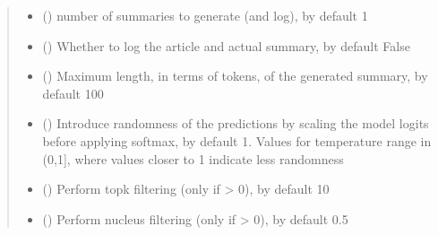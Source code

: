 \documentclass[letterpaper,10pt,english]{sphinxmanual}
\begin{document}
\begin{fulllineitems}
\begin{fulllineitems}
\begin{quote}
\begin{description}
\begin{itemize}
\item {} 
\sphinxAtStartPar
{} (\sphinxstyleliteralemphasis{\sphinxupquote{, }}) \textendash{} number of summaries to generate (and log), by default 1

\item {} 
\sphinxAtStartPar
{} (\sphinxstyleliteralemphasis{\sphinxupquote{, }}) \textendash{} Whether to log the article and actual summary, by default False

\item {} 
\sphinxAtStartPar
{} (\sphinxstyleliteralemphasis{\sphinxupquote{, }}) \textendash{} Maximum length, in terms of tokens, of the generated summary, by default 100

\item {} 
\sphinxAtStartPar
{} (\sphinxstyleliteralemphasis{\sphinxupquote{, }}) \textendash{} Introduce randomness of the predictions by scaling the model logits before
applying softmax, by default 1. Values for temperature range in (0,1{]}, where
values closer to 1 indicate less randomness

\item {} 
\sphinxAtStartPar
{} (\sphinxstyleliteralemphasis{\sphinxupquote{, }}) \textendash{} Perform top\sphinxhyphen{}k filtering (only if  \textgreater{} 0), by default 10

\item {} 
\sphinxAtStartPar
{} (\sphinxstyleliteralemphasis{\sphinxupquote{, }}) \textendash{} Perform nucleus filtering (only if  \textgreater{} 0), by default 0.5

\end{itemize}


\end{description}
\end{quote}
\end{fulllineitems}
\end{fulllineitems}
\end{document}
